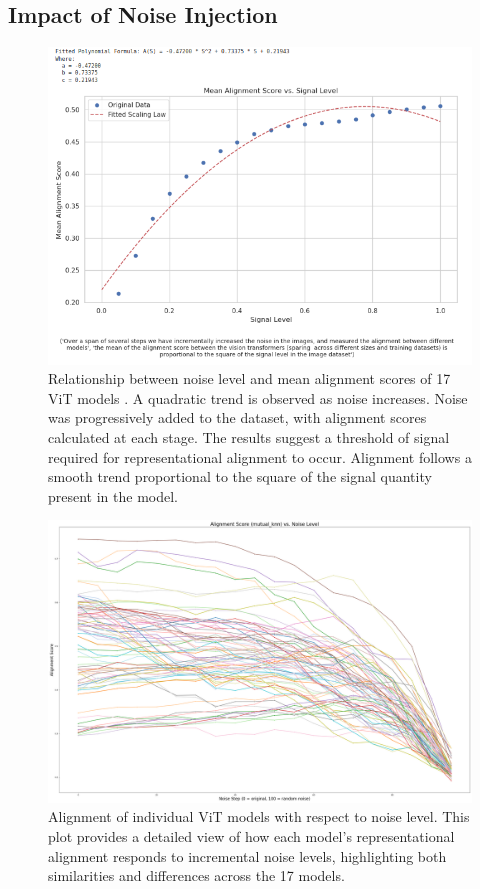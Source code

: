 \documentclass[10pt,a4paper]{article}
\begin{document}
\subsection{Impact of Noise Injection}
\begin{figure}[H]
    \centering
    \includegraphics[width=\textwidth]{alignment_vs_signal_level.png}
    \caption{Relationship between noise level and mean alignment scores of 17 ViT models \cite{dosovitskiy2020vit} \cite{MaskedAutoencoders2021}. A quadratic trend is observed as noise increases. Noise was progressively added to the dataset, with alignment scores calculated at each stage. The results suggest a threshold of signal required for representational alignment to occur. Alignment follows a smooth trend proportional to the square of the signal quantity present in the model.}
    \label{fig:alignment_vs_signal_level}
\end{figure}

\clearpage

\begin{figure}[H]
    \centering
    \includegraphics[width=\textwidth]{alignment_plot.png}
    \caption{Alignment of individual ViT models with respect to noise level. This plot provides a detailed view of how each model’s representational alignment responds to incremental noise levels, highlighting both similarities and differences across the 17 models.}
    \label{fig:alignment_plot}
\end{figure}
\end{document}
